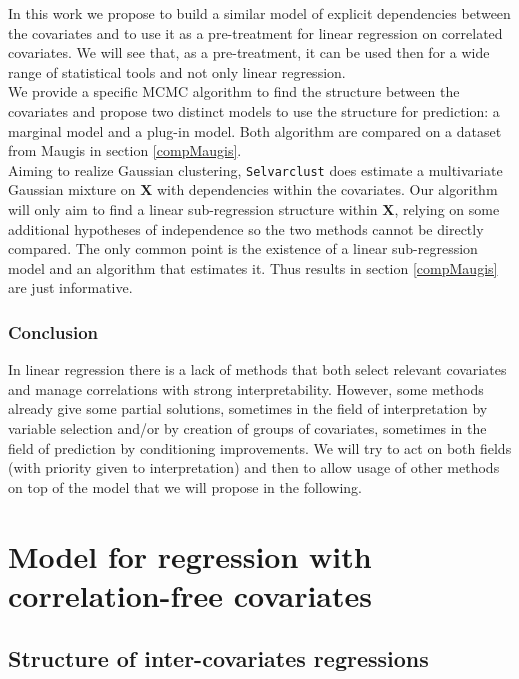 \documentclass[12pt,a4paper]{report}
\begin{document}
			In this work we propose to build a similar model of explicit dependencies between the covariates and to use it as a pre-treatment for linear regression on correlated covariates. We will see that, as a pre-treatment, it can be used then for a wide range of statistical tools and not only linear regression.\\
			We provide a specific MCMC algorithm to find the structure between the covariates and propose two distinct models to use the structure for prediction: a marginal model and a plug-in model. Both algorithm are compared on a dataset from Maugis in section \ref{compMaugis}.	\\
			
			Aiming to realize Gaussian clustering, {\tt Selvarclust} does estimate a multivariate Gaussian mixture on $\boldsymbol{X}$ with dependencies within the covariates. Our algorithm will only aim to find a linear sub-regression structure within $\boldsymbol{X}$, relying on some additional hypotheses of independence so the two methods cannot be directly compared. The only common point is the existence of a linear sub-regression model and an algorithm that estimates it. Thus results in section \ref{compMaugis} are just informative.
	
\section{Conclusion} In linear regression there is a lack of methods that both select relevant covariates and manage correlations with strong interpretability. However, some methods already give some partial solutions, sometimes in the field of interpretation by variable selection and/or by creation of groups of covariates, sometimes in the field of prediction by conditioning improvements. We will try to act on both fields (with priority given to interpretation) and then to allow usage of other methods on top of the model that we will propose in the following.	
			
\part{Model for regression with correlation-free covariates}
\chapter{Structure of inter-covariates regressions}\label{chapexpl}
\end{document}
